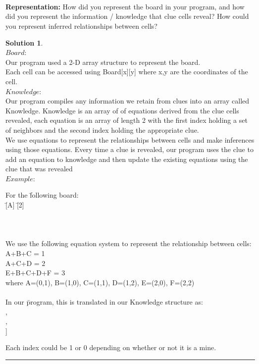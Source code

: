 \documentclass{article}
\theoremstyle{definition}
\def\fline{\rule{0.75\linewidth}{0.5pt}}
\newcommand{\finishline}{\vspace{-15pt}\begin{center}\fline\end{center}}
\newtheorem*{solution*}{Solution}
\newenvironment{solution}{\begin{solution*}}{{\finishline} \end{solution*}}
\begin{document}
\\\\\\
\textbf{Representation:}
	How did you represent the board in your program, and how did you represent the information / knowledge that clue cells reveal? How could you represent inferred relationships between cells? \\
\begin{solution} \hfill \\
    $Board$: \\
    Our program used a 2-D array structure to represent the board. \\
    Each cell can be accessed using Board[x][y] where x,y are the coordinates of the cell. \\
    	   
    $Knowledge$: \\
    Our program compiles any information we retain from clues into an array called Knowledge. Knowledge is an array of of equations derived from the clue cells revealed, each equation is an array of length 2 with the first index holding a set of neighbors and the second index holding the appropriate clue. \\
    We use equations to represent the relationships between cells and make inferences using those equations. Every time a clue is revealed, our program uses the clue to add an equation to knowledge and then update the existing equations using the clue that was revealed \\
    
    $Example$: 
    \begin{tabbing}
    For the \=following board:\\
    \>[1] \=[A] \=[2] \\ 
    \>[B] \>[C] \>[D] \\
    \>[E] \>[3] \>[F] \\\\
    
	We use \=the following equation system to represent the relationship between cells: \\
	\>A+B+C = 1 \\
	\>A+C+D = 2 \\
	\>E+B+C+D+F = 3\=\\
	\>\>where A=(0,1), B=(1,0), C=(1,1), D=(1,2), E=(2,0), F=(2,2) \\\\
	
	In our \=program, this is translated in our Knowledge structure as: \\
	\> [ \=[ \{ (0,1),(1,0),(1,1) \} ,1], \\
	    \>\>[ \{ (0,1),(1,1),(1,2) \} ,2], \\
	    \>\>[ \{ (2,0),(1,0),(1,1),(1,2),(2,2) \} ,3] ]
	\end{tabbing}
	Each index could be 1 or 0 depending on whether or not it is a mine.
\end{solution}
\smallskip
\end{document}

